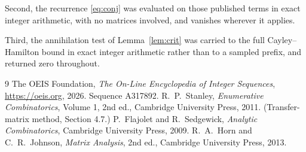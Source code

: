 \documentclass[11pt,a4paper]{article}
\theoremstyle{plain}
\theoremstyle{definition}
\begin{document}
Second, the recurrence \eqref{eq:conj} was evaluated on those published terms in exact
integer arithmetic, with no matrices involved, and vanishes wherever it applies.

Third, the annihilation test of Lemma~\ref{lem:crit} was carried to the full
Cayley--Hamilton bound in exact integer arithmetic rather than to a sampled prefix, and
returned zero throughout.

\begin{thebibliography}{9}
 The OEIS Foundation, \emph{The On-Line Encyclopedia of Integer
Sequences}, \url{https://oeis.org}, 2026. Sequence A317892.
 R.~P.~Stanley, \emph{Enumerative Combinatorics}, Volume 1, 2nd ed.,
Cambridge University Press, 2011. (Transfer-matrix method, Section 4.7.)
 P.~Flajolet and R.~Sedgewick, \emph{Analytic Combinatorics}, Cambridge
University Press, 2009.
 R.~A.~Horn and C.~R.~Johnson, \emph{Matrix Analysis}, 2nd ed., Cambridge
University Press, 2013.
\end{thebibliography}
\end{document}
